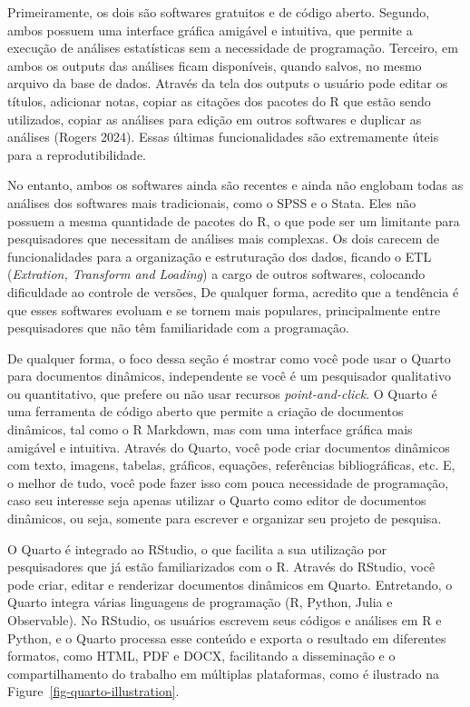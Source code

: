 \documentclass[
  a4paper,
]{article}
\begin{document}
Primeiramente, os dois são softwares gratuitos e de código aberto.
Segundo, ambos possuem uma interface gráfica amigável e intuitiva, que
permite a execução de análises estatísticas sem a necessidade de
programação. Terceiro, em ambos os outputs das análises ficam
disponíveis, quando salvos, no mesmo arquivo da base de dados. Através
da tela dos outputs o usuário pode editar os títulos, adicionar notas,
copiar as citações dos pacotes do R que estão sendo utilizados, copiar
as análises para edição em outros softwares e duplicar as análises
(Rogers 2024). Essas últimas funcionalidades são extremamente úteis para
a reprodutibilidade.

No entanto, ambos os softwares ainda são recentes e ainda não englobam
todas as análises dos softwares mais tradicionais, como o SPSS e o
Stata. Eles não possuem a mesma quantidade de pacotes do R, o que pode
ser um limitante para pesquisadores que necessitam de análises mais
complexas. Os dois carecem de funcionalidades para a organização e
estruturação dos dados, ficando o ETL (\emph{Extration, Transform and
Loading}) a cargo de outros softwares, colocando dificuldade ao controle
de versões, De qualquer forma, acredito que a tendência é que esses
softwares evoluam e se tornem mais populares, principalmente entre
pesquisadores que não têm familiaridade com a programação.

De qualquer forma, o foco dessa seção é mostrar como você pode usar o
Quarto para documentos dinâmicos, independente se você é um pesquisador
qualitativo ou quantitativo, que prefere ou não usar recursos
\emph{point-and-click}. O Quarto é uma ferramenta de código aberto que
permite a criação de documentos dinâmicos, tal como o R Markdown, mas
com uma interface gráfica mais amigável e intuitiva. Através do Quarto,
você pode criar documentos dinâmicos com texto, imagens, tabelas,
gráficos, equações, referências bibliográficas, etc. E, o melhor de
tudo, você pode fazer isso com pouca necessidade de programação, caso
seu interesse seja apenas utilizar o Quarto como editor de documentos
dinâmicos, ou seja, somente para escrever e organizar seu projeto de
pesquisa.

O Quarto é integrado ao RStudio, o que facilita a sua utilização por
pesquisadores que já estão familiarizados com o R. Através do RStudio,
você pode criar, editar e renderizar documentos dinâmicos em Quarto.
Entretando, o Quarto integra várias linguagens de programação (R,
Python, Julia e Observable). No RStudio, os usuários escrevem seus
códigos e análises em R e Python, e o Quarto processa esse conteúdo e
exporta o resultado em diferentes formatos, como HTML, PDF e DOCX,
facilitando a disseminação e o compartilhamento do trabalho em múltiplas
plataformas, como é ilustrado na Figure~\ref{fig-quarto-illustration}.
\end{document}

